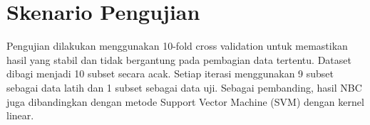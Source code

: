 \section{Skenario Pengujian}

Pengujian dilakukan menggunakan 10-fold cross validation untuk memastikan hasil yang stabil dan tidak bergantung pada pembagian data tertentu. Dataset dibagi menjadi 10 subset secara acak. Setiap iterasi menggunakan 9 subset sebagai data latih dan 1 subset sebagai data uji. Sebagai pembanding, hasil NBC juga dibandingkan dengan metode Support Vector Machine (SVM) dengan kernel linear.
